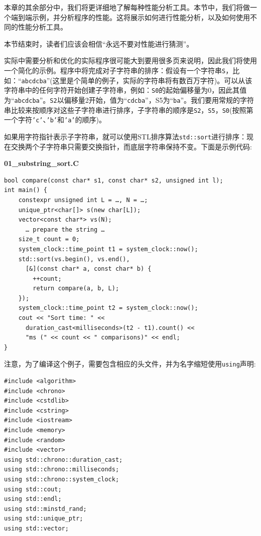 
本章的其余部分中，我们将更详细地了解每种性能分析工具。本节中，我们将做一个端到端示例，并分析程序的性能。这将展示如何进行性能分析，以及如何使用不同的性能分析工具。

本节结束时，读者们应该会相信“永远不要对性能进行猜测”。

实际中需要分析和优化的实际程序很可能大到要用很多页来说明，因此我们将使用一个简化的示例。程序中将完成对子字符串的排序：假设有一个字符串\texttt{S}，比如：“\texttt{abcdcba}”(这里是个简单的例子，实际的字符串将有数百万字符)。可以从该字符串中的任何字符开始创建子字符串，例如：\texttt{S0}的起始偏移量为0，因此其值为“\texttt{abcdcba}”。\texttt{S2}以偏移量2开始，值为“\texttt{cdcba}”，S5为“\texttt{ba}”。我们要用常规的字符串比较来按顺序对这些子字符串进行排序，子字符串的顺序是\texttt{S2}，\texttt{S5}，\texttt{S0}(按照第一个字符\texttt{'c'}、\texttt{'b'}和\texttt{'a'}的顺序)。

如果用字符指针表示子字符串，就可以使用STL排序算法\texttt{std::sort}进行排序：现在交换两个子字符串只需要交换指针，而底层字符串保持不变。下面是示例代码:

\noindent
\textbf{01\_substring\_sort.C}
\begin{lstlisting}[style=styleCXX]
bool compare(const char* s1, const char* s2, unsigned int l);
int main() {
	constexpr unsigned int L = …, N = …;
	unique_ptr<char[]> s(new char[L]);
	vector<const char*> vs(N);
	  … prepare the string …
	size_t count = 0;
	system_clock::time_point t1 = system_clock::now();
	std::sort(vs.begin(), vs.end(),
	  [&](const char* a, const char* b) {
		++count;
		return compare(a, b, L);
	});
	system_clock::time_point t2 = system_clock::now();
	cout << "Sort time: " <<
	  duration_cast<milliseconds>(t2 - t1).count() <<
	  "ms (" << count << " comparisons)" << endl;
}
\end{lstlisting}

注意，为了编译这个例子，需要包含相应的头文件，并为名字缩短使用\texttt{using}声明:

\begin{lstlisting}[style=styleCXX]
#include <algorithm>
#include <chrono>
#include <cstdlib>
#include <cstring>
#include <iostream>
#include <memory>
#include <random>
#include <vector>
using std::chrono::duration_cast;
using std::chrono::milliseconds;
using std::chrono::system_clock;
using std::cout;
using std::endl;
using std::minstd_rand;
using std::unique_ptr;
using std::vector;
\end{lstlisting}


